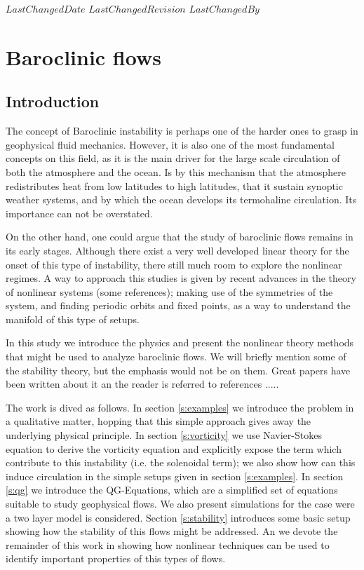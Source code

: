 {$LastChangedDate$}
{$LastChangedRevision$} {$LastChangedBy$}

\chapter{Baroclinic flows}
\label{chap:baroclinic}
\section{Introduction}
\label{s:intro}
The concept of Baroclinic instability is perhaps one of the harder ones to grasp in geophysical fluid mechanics. However, it is also one of the most fundamental concepts on this field, as it is the main driver for the large scale circulation of both the atmosphere and the ocean. Is by this mechanism that the atmosphere redistributes heat from low latitudes to high latitudes, that it sustain synoptic weather systems, and by which the ocean develops its termohaline circulation. Its importance can not be overstated.

On the other hand, one could argue that the study of baroclinic flows remains in its early stages. Although there exist a very well developed linear theory for the onset of this type of instability, there still much room to explore the nonlinear regimes. A way to approach this studies is given by recent advances in the theory of nonlinear systems (some references); making use of the symmetries of the system, and finding periodic orbits and fixed points, as a way to understand the manifold of this type of setups.

In this study we introduce the physics and present the nonlinear theory methods that might be used to analyze baroclinic flows. We will briefly mention some of the stability theory, but the emphasis would not be on them. Great papers have been written about it an the reader is referred to references .....

The work is dived as follows. In section \ref{s:examples} we introduce the problem in a qualitative matter, hopping that this simple approach gives away the underlying physical principle. In section \ref{s:vorticity} we use Navier-Stokes equation to derive the vorticity equation and explicitly expose the term which contribute to this instability (i.e. the solenoidal term); we also show how can this induce circulation in the simple setups given in section \ref{s:examples}. In section \ref{s:qg} we introduce the QG-Equations, which are a simplified set of equations suitable to study geophysical flows. We also present simulations for the case were a two layer model is considered. Section \ref{s:stability} introduces some basic setup showing how the stability of this flows might be addressed. An we devote the remainder of this work in showing how nonlinear techniques can be used to identify important properties of this types of flows.
